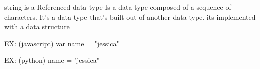 string 
  is a Referenced data type
  Is a data type composed of a sequence of characters.
  It's a data type that's built out of another data type.
  its implemented with a data structure

  EX:   (javascript)
    var name = "jessica" 

  EX:    (python)
    name = "jessica"


